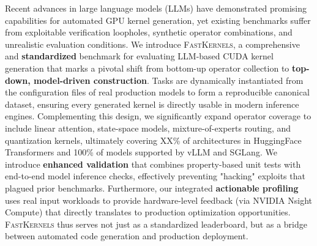 Recent advances in large language models (LLMs) have demonstrated promising capabilities for automated GPU kernel generation, yet existing benchmarks suffer from exploitable verification loopholes, synthetic operator combinations, and unrealistic evaluation conditions.
We introduce \textsc{FastKernels}, a comprehensive and \textbf{standardized} benchmark for evaluating LLM-based CUDA kernel generation that marks a pivotal shift from bottom-up operator collection to \textbf{top-down, model-driven construction}.
Tasks are dynamically instantiated from the configuration files of real production models to form a reproducible canonical dataset, ensuring every generated kernel is directly usable in modern inference engines.
Complementing this design, we significantly expand operator coverage to include linear attention, state-space models, mixture-of-experts routing, and quantization kernels, ultimately covering XX\% of architectures in HuggingFace Transformers and 100\% of models supported by vLLM and SGLang.
We introduce \textbf{enhanced validation} that combines property-based unit tests with end-to-end model inference checks, effectively preventing "hacking" exploits that plagued prior benchmarks.
Furthermore, our integrated \textbf{actionable profiling} uses real input workloads to provide hardware-level feedback (via NVIDIA Nsight Compute) that directly translates to production optimization opportunities.
\textsc{FastKernels} thus serves not just as a standardized leaderboard, but as a bridge between automated code generation and production deployment.